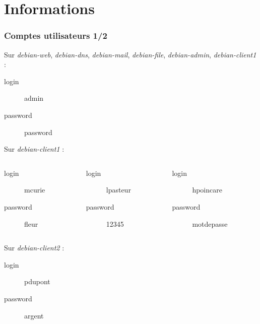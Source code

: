 \documentclass{beamer}
\begin{document}
	\section{Informations}
		\begin{frame}
			\frametitle{Comptes utilisateurs 1/2}
			\begin{alertblock}{Sur \textit{debian-web}, \textit{debian-dns}, \textit{debian-mail}, \textit{debian-file}, \textit{debian-admin}, \textit{debian-client1} :}
				\begin{description}
					\item[login] admin
					\item[password] password
				\end{description}
			\end{alertblock}
			\begin{alertblock}{Sur \textit{debian-client1} :}
				\begin{columns}
					\begin{column}{.28\linewidth}
						\begin{description}
							\item[login] mcurie
							\item[password] fleur
						\end{description}
					\end{column}
					\begin{column}{.29\linewidth}
						\begin{description}
							\item[login] lpasteur
							\item[password] 12345
						\end{description}
					\end{column}
					\begin{column}{.34\linewidth}
						\begin{description}
							\item[login] hpoincare
							\item[password] motdepasse
						\end{description}
					\end{column}
				\end{columns}
			\end{alertblock}
			\begin{alertblock}{Sur \textit{debian-client2} :}
				\begin{description}
					\item[login] pdupont
					\item[password] argent
				\end{description}
			\end{alertblock}
		\end{frame}
\end{document}
